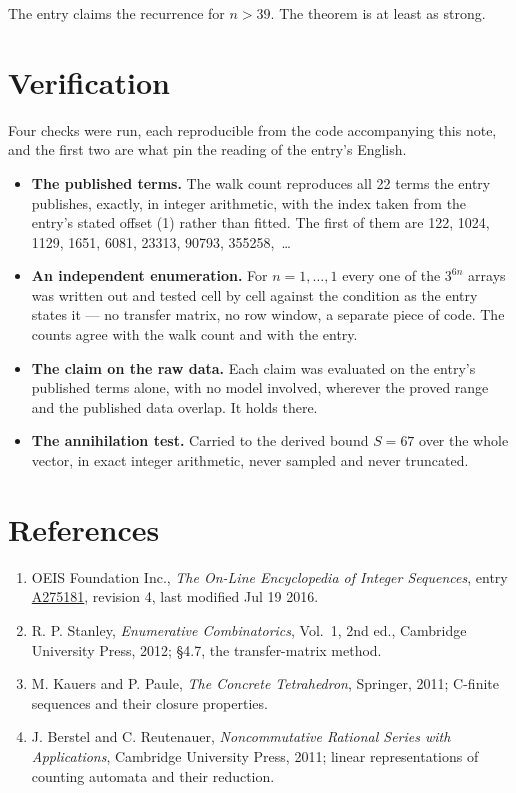 \documentclass[11pt]{article}
\theoremstyle{definition}
\begin{document}
The entry claims the recurrence for $n > 39$. The theorem is at least as strong.

\section{Verification}

Four checks were run, each reproducible from the code accompanying this note, and the first two are what pin the reading of the entry's English.

\begin{itemize}

\item {\bfseries The published terms.} The walk count reproduces all 22 terms the entry publishes, exactly, in integer arithmetic, with the index taken from the entry's stated offset (1) rather than fitted. The first of them are 122, 1024, 1129, 1651, 6081, 23313, 90793, 355258,~\dots

\item {\bfseries An independent enumeration.} For $n = 1,\dots,1$ every one of the $3^{6n}$ arrays was written out and tested cell by cell against the condition as the entry states it --- no transfer matrix, no row window, a separate piece of code. The counts agree with the walk count and with the entry.

\item {\bfseries The claim on the raw data.} Each claim was evaluated on the entry's published terms alone, with no model involved, wherever the proved range and the published data overlap. It holds there.

\item {\bfseries The annihilation test.} Carried to the derived bound $S = 67$ over the whole vector, in exact integer arithmetic, never sampled and never truncated.

\end{itemize}

\section{References}

\begin{enumerate}

\item OEIS Foundation Inc., \emph{The On-Line Encyclopedia of Integer Sequences}, entry \href{https://oeis.org/A275181}{A275181}, revision 4, last modified Jul 19 2016.

\item R. P. Stanley, \emph{Enumerative Combinatorics}, Vol.~1, 2nd ed., Cambridge University Press, 2012; \S4.7, the transfer-matrix method.

\item M. Kauers and P. Paule, \emph{The Concrete Tetrahedron}, Springer, 2011; C-finite sequences and their closure properties.

\item J. Berstel and C. Reutenauer, \emph{Noncommutative Rational Series with Applications}, Cambridge University Press, 2011; linear representations of counting automata and their reduction.

\end{enumerate}
\end{document}
